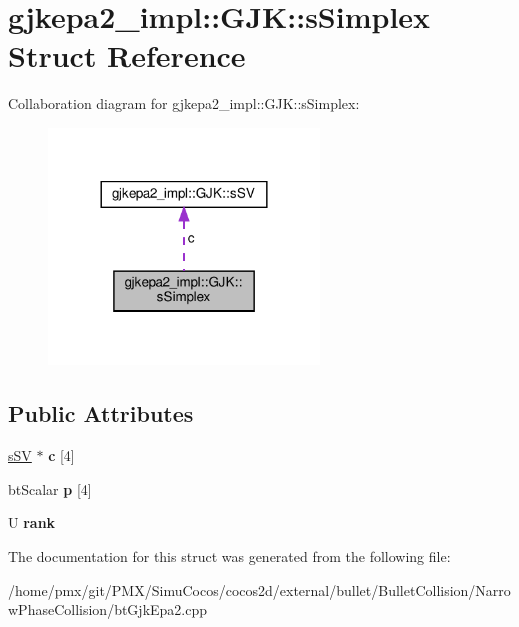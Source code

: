 \hypertarget{structgjkepa2__impl_1_1GJK_1_1sSimplex}{}\section{gjkepa2\+\_\+impl\+:\+:G\+JK\+:\+:s\+Simplex Struct Reference}
\label{structgjkepa2__impl_1_1GJK_1_1sSimplex}


Collaboration diagram for gjkepa2\+\_\+impl\+:\+:G\+JK\+:\+:s\+Simplex\+:
\nopagebreak
\begin{figure}[H]
\begin{center}
\leavevmode
\includegraphics[width=204pt]{structgjkepa2__impl_1_1GJK_1_1sSimplex__coll__graph}
\end{center}
\end{figure}
\subsection*{Public Attributes}
\begin{DoxyCompactItemize}
\item 
\mbox{\label{structgjkepa2__impl_1_1GJK_1_1sSimplex_a1fb2add7d2c837c16e2369b6c1ca8ff9}} 
\hyperlink{structgjkepa2__impl_1_1GJK_1_1sSV}{s\+SV} $\ast$ {\bfseries c} \mbox{[}4\mbox{]}
\item 
\mbox{\label{structgjkepa2__impl_1_1GJK_1_1sSimplex_a213f4cdd828ba68282330f2390accfc7}} 
bt\+Scalar {\bfseries p} \mbox{[}4\mbox{]}
\item 
\mbox{\label{structgjkepa2__impl_1_1GJK_1_1sSimplex_a97bc5764f27917fef42a979f21c1c040}} 
U {\bfseries rank}
\end{DoxyCompactItemize}


The documentation for this struct was generated from the following file\+:\begin{DoxyCompactItemize}
\item 
/home/pmx/git/\+P\+M\+X/\+Simu\+Cocos/cocos2d/external/bullet/\+Bullet\+Collision/\+Narrow\+Phase\+Collision/bt\+Gjk\+Epa2.\+cpp\end{DoxyCompactItemize}
